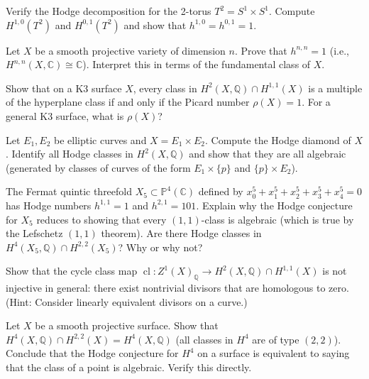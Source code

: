 \begin{exercise}
Verify the Hodge decomposition for the 2-torus $T^2 = S^1 \times S^1$. Compute $H^{1,0}(T^2)$ and $H^{0,1}(T^2)$ and show that $h^{1,0} = h^{0,1} = 1$.
\end{exercise}

\begin{exercise}
Let $X$ be a smooth projective variety of dimension $n$. Prove that $h^{n,n} = 1$ (i.e., $H^{n,n}(X, \mathbb{C}) \cong \mathbb{C}$). Interpret this in terms of the fundamental class of $X$.
\end{exercise}

\begin{exercise}
Show that on a K3 surface $X$, every class in $H^2(X, \mathbb{Q}) \cap H^{1,1}(X)$ is a multiple of the hyperplane class if and only if the Picard number $\rho(X) = 1$. For a general K3 surface, what is $\rho(X)$?
\end{exercise}

\begin{exercise}
Let $E_1, E_2$ be elliptic curves and $X = E_1 \times E_2$. Compute the Hodge diamond of $X$. Identify all Hodge classes in $H^2(X, \mathbb{Q})$ and show that they are all algebraic (generated by classes of curves of the form $E_1 \times \{p\}$ and $\{p\} \times E_2$).
\end{exercise}

\begin{exercise}
The Fermat quintic threefold $X_5 \subset \mathbb{P}^4(\mathbb{C})$ defined by $x_0^5 + x_1^5 + x_2^5 + x_3^5 + x_4^5 = 0$ has Hodge numbers $h^{1,1} = 1$ and $h^{2,1} = 101$. Explain why the Hodge conjecture for $X_5$ reduces to showing that every $(1,1)$-class is algebraic (which is true by the Lefschetz $(1,1)$ theorem). Are there Hodge classes in $H^4(X_5, \mathbb{Q}) \cap H^{2,2}(X_5)$? Why or why not?
\end{exercise}

\begin{exercise}
Show that the cycle class map $\operatorname{cl}: Z^1(X)_{\mathbb{Q}} \to H^2(X, \mathbb{Q}) \cap H^{1,1}(X)$ is not injective in general: there exist nontrivial divisors that are homologous to zero. (Hint: Consider linearly equivalent divisors on a curve.)
\end{exercise}

\begin{exercise}
Let $X$ be a smooth projective surface. Show that $H^4(X, \mathbb{Q}) \cap H^{2,2}(X) = H^4(X, \mathbb{Q})$ (all classes in $H^4$ are of type $(2,2)$). Conclude that the Hodge conjecture for $H^4$ on a surface is equivalent to saying that the class of a point is algebraic. Verify this directly.
\end{exercise}

